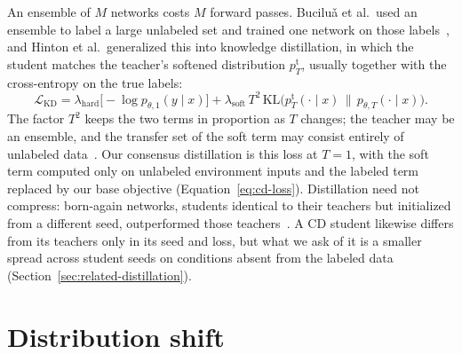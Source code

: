 An ensemble of $M$ networks costs $M$ forward passes. Bucilu\v{a} et
al.\ used an ensemble to label a large unlabeled set and trained one
network on those labels~\cite{bucilua2006model}, and Hinton et al.\
generalized this into knowledge distillation, in which the student
matches the teacher's softened distribution $p^{\mathrm{t}}_T$,
usually together with the cross-entropy on the true labels:
\begin{equation}
  \mathcal{L}_{\mathrm{KD}}
  = \lambda_{\mathrm{hard}}\bigl[-\log p_{\theta,1}(y\mid x)\bigr]
  + \lambda_{\mathrm{soft}}\,T^2\,
    \mathrm{KL}\bigl(p^{\mathrm{t}}_T(\cdot\mid x)\,\|\,p_{\theta,T}(\cdot\mid x)\bigr) .
  \label{eq:bg-kd}
\end{equation}
The factor $T^2$ keeps the two terms in proportion as $T$ changes; the
teacher may be an ensemble, and the transfer set of the soft term may
consist entirely of unlabeled data~\cite{hinton2015distilling}.
Our consensus distillation is this loss at $T=1$, with the soft term
computed only on unlabeled environment inputs and the labeled term
replaced by our base objective (Equation~\ref{eq:cd-loss}). Distillation
need not compress: born-again networks, students identical to their
teachers but initialized from a different seed, outperformed those
teachers~\cite{furlanello2018born}. A CD student likewise differs from
its teachers only in its seed and loss, but what we ask of it is a
smaller spread across student seeds on conditions absent from the
labeled data (Section~\ref{sec:related-distillation}).

\section{Distribution shift}
\label{sec:bg-shift}

